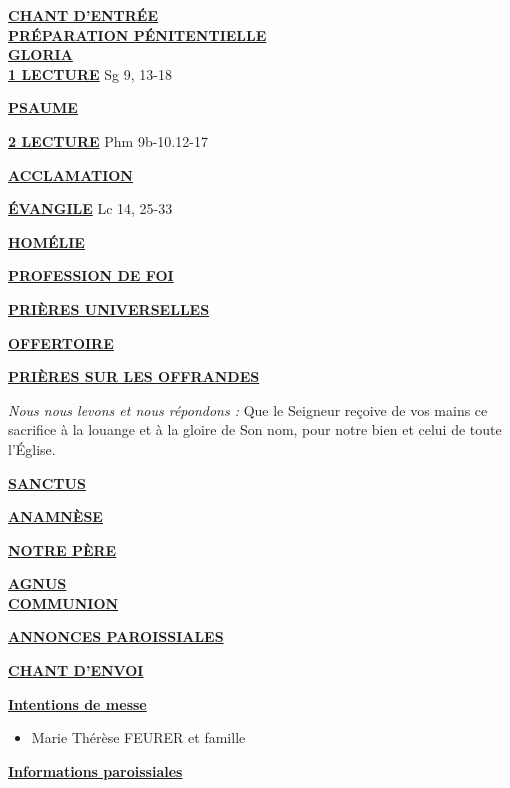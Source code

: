 \documentclass[french,11pt]{article}
\newcommand*{\chants}{../chants}
\newcommand*{\messe}{../messe_david_julien}
\newcommand*{\pu}{../pu}
\newcommand*{\psaumes}{../psaumes}
\newcommand{\NewsItem}[1]{%
\vspace{3pt}
\underline{\textbf{#1}}
		  }
\begin{document}
\NewsItem{CHANT D'ENTRÉE}\\
	

\NewsItem{PRÉPARATION PÉNITENTIELLE}\\
	

\NewsItem{GLORIA}\\
	


\NewsItem{1\iere{} LECTURE} Sg 9, 13-18

\NewsItem{PSAUME}


\NewsItem{2\ieme{} LECTURE} Phm 9b-10.12-17

\NewsItem{ACCLAMATION}


\NewsItem{ÉVANGILE} Lc 14, 25-33

\NewsItem{HOMÉLIE}

\NewsItem{PROFESSION DE FOI}
%


\NewsItem{PRIÈRES UNIVERSELLES}


\NewsItem{OFFERTOIRE}

\NewsItem{PRIÈRES SUR LES OFFRANDES}
\textit{Nous nous levons et nous répondons : }
Que le Seigneur reçoive de vos mains ce sacrifice à la louange et à la gloire
de Son nom, pour notre bien et celui de toute l’Église.

\NewsItem{SANCTUS}


\NewsItem{ANAMNÈSE}


\NewsItem{NOTRE PÈRE}

\NewsItem{AGNUS} \\


\NewsItem{COMMUNION}


\NewsItem{ANNONCES PAROISSIALES}


\NewsItem{CHANT D'ENVOI}


\newpage

\NewsItem{Intentions de messe}
\begin{itemize}
\item[\Cross] Marie Thérèse FEURER et famille
\end{itemize}

\NewsItem{Informations paroissiales}
\end{document}
